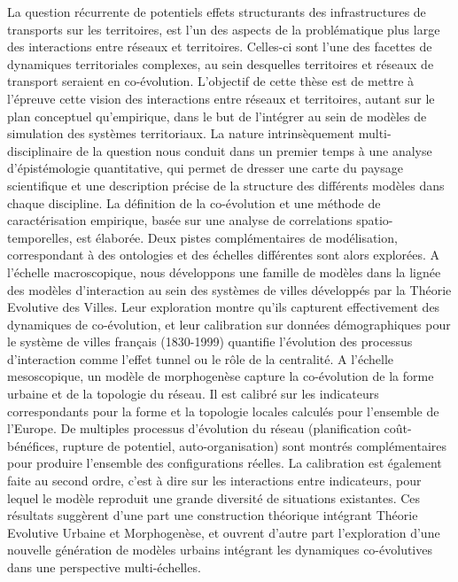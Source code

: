 La question récurrente de potentiels effets structurants des infrastructures de transports sur les territoires, est l'un des aspects de la problématique plus large des interactions entre réseaux et territoires. Celles-ci sont l'une des facettes de dynamiques territoriales complexes, au sein desquelles territoires et réseaux de transport seraient en co-évolution. L'objectif de cette thèse est de mettre à l'épreuve cette vision des interactions entre réseaux et territoires, autant sur le plan conceptuel qu'empirique, dans le but de l'intégrer au sein de modèles de simulation des systèmes territoriaux. La nature intrinsèquement multi-disciplinaire de la question nous conduit dans un premier temps à une analyse d'épistémologie quantitative, qui permet de dresser une carte du paysage scientifique et une description précise de la structure des différents modèles dans chaque discipline. La définition de la co-évolution et une méthode de caractérisation empirique, basée sur une analyse de correlations spatio-temporelles, est élaborée. Deux pistes complémentaires de modélisation, correspondant à des ontologies et des échelles différentes sont alors explorées. A l'échelle macroscopique, nous développons une famille de modèles dans la lignée des modèles d'interaction au sein des systèmes de villes développés par la Théorie Evolutive des Villes. Leur exploration montre qu'ils capturent effectivement des dynamiques de co-évolution, et leur calibration sur données démographiques pour le système de villes français (1830-1999) quantifie l'évolution des processus d'interaction comme l'effet tunnel ou le rôle de la centralité. A l'échelle mesoscopique, un modèle de morphogenèse capture la co-évolution de la forme urbaine et de la topologie du réseau. Il est calibré sur les indicateurs correspondants pour la forme et la topologie locales calculés pour l'ensemble de l'Europe. De multiples processus d'évolution du réseau (planification coût-bénéfices, rupture de potentiel, auto-organisation) sont montrés complémentaires pour produire l'ensemble des configurations réelles. La calibration est également faite au second ordre, c'est à dire sur les interactions entre indicateurs, pour lequel le modèle reproduit une grande diversité de situations existantes. Ces résultats suggèrent d'une part une construction théorique intégrant Théorie Evolutive Urbaine et Morphogenèse, et ouvrent d'autre part l'exploration d'une nouvelle génération de modèles urbains intégrant les dynamiques co-évolutives dans une perspective multi-échelles.




